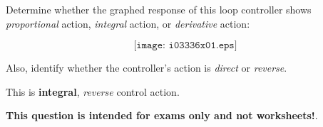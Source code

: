 

Determine whether the graphed response of this loop controller shows {\it proportional} action, {\it integral} action, or {\it derivative} action:

$$\texttt{[image: i03336x01.eps]}$$

Also, identify whether the controller's action is {\it direct} or {\it reverse}.







This is {\bf integral}, {\it reverse} control action.







{\bf This question is intended for exams only and not worksheets!}.



